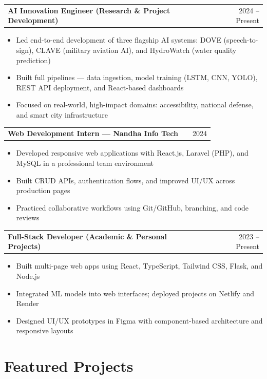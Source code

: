 \documentclass[a4paper,11pt]{article}
\makeatletter
\newenvironment{joblong}[2]
    {
    \begin{tabularx}{\linewidth}{@{}l X r@{}}
    \textbf{#1} & \hfill & #2 \\[2pt]
    \end{tabularx}
    \begin{minipage}[t]{\linewidth}
    \begin{itemize}[nosep,after=\strut, leftmargin=1em, itemsep=2pt,label=--]
    }
    {
    \end{itemize}
    \end{minipage}
    }
\makeatother
\begin{document}
\begin{joblong}{AI Innovation Engineer \textnormal{\small{(Research \& Project Development)}}}{2024 -- Present}
\item Led end-to-end development of three flagship AI systems: DOVE (speech-to-sign), CLAVE (military aviation AI), and HydroWatch (water quality prediction)
\item Built full pipelines — data ingestion, model training (LSTM, CNN, YOLO), REST API deployment, and React-based dashboards
\item Focused on real-world, high-impact domains: accessibility, national defense, and smart city infrastructure
\end{joblong}

\vspace{2pt}

\begin{joblong}{Web Development Intern \textnormal{\small{--- Nandha Info Tech}}}{2024}
\item Developed responsive web applications with React.js, Laravel (PHP), and MySQL in a professional team environment
\item Built CRUD APIs, authentication flows, and improved UI/UX across production pages
\item Practiced collaborative workflows using Git/GitHub, branching, and code reviews
\end{joblong}

\vspace{2pt}

\begin{joblong}{Full-Stack Developer \textnormal{\small{(Academic \& Personal Projects)}}}{2023 -- Present}
\item Built multi-page web apps using React, TypeScript, Tailwind CSS, Flask, and Node.js
\item Integrated ML models into web interfaces; deployed projects on Netlify and Render
\item Designed UI/UX prototypes in Figma with component-based architecture and responsive layouts
\end{joblong}

\section{Featured Projects}
\end{document}
